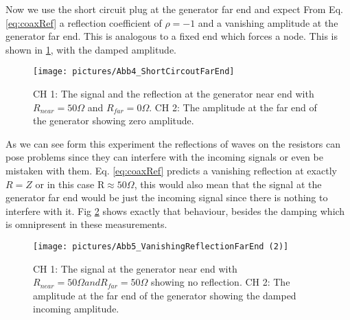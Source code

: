 \documentclass[a4paper,10pt,twocolumn]{article}
\begin{document}
    Now we use the short circuit plug at the generator far end and expect From Eq. \ref{eq:coaxRef} a reflection coefficient of $\rho = -1 $ and a vanishing amplitude at the generator far end.
    This is analogous to a fixed end which forces a node.
    This is shown in \ref{fig:ShortCircuitFarEnd}, with the damped amplitude.
    \begin{figure}[htbp]                                 %
        \begin{center}                                       %
            \texttt{[image: pictures/Abb4\_ShortCircoutFarEnd]}      %
            \caption[]{CH 1: The signal and the reflection at the generator near end with $R_{near}=50\Omega$ and $ R_{far} = 0\Omega.$ CH 2: The amplitude at the far end of the generator showing zero amplitude.}   %
            \label{fig:ShortCircuitFarEnd}                                      %
        \end{center}
    \end{figure}
    
    As we can see form this experiment the reflections of waves on the resistors can pose problems since they can interfere with the incoming signals or even be mistaken with them.
    Eq. \ref{eq:coaxRef} predicts a vanishing reflection at exactly $R=Z$ or in this case R$\approx 50\Omega$, this would also mean that the signal at the generator far end would be just the incoming signal since there is nothing to interfere with it.
    Fig \ref{fig:VanishingReflectionFarEnd} shows exactly that behaviour, besides the damping which is omnipresent in these measurements.
    \begin{figure}[htbp]                                 
        \begin{center}                                       
            \texttt{[image: pictures/Abb5\_VanishingReflectionFarEnd (2)]}      
            \caption[]{CH 1: The signal at the generator near end with $R_{near}=50\Omega and R_{far}=50\Omega$ showing no reflection. CH 2: The amplitude at the far end of the generator showing the damped incoming amplitude.}   %
            \label{fig:VanishingReflectionFarEnd}                                      
        \end{center}
    \end{figure}
\end{document}
